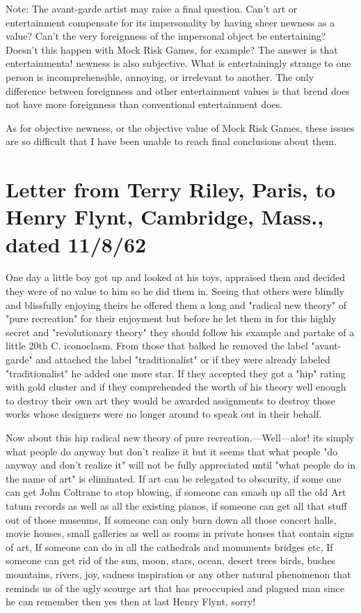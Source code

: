 \documentclass[10pt,twoside,draft]{memoir}
\begin{document}
{Note: The avant-garde artist may raise a final question. Can't art or 
entertainment compensate for its impersonality by having sheer newness as a 
value? Can't the very foreignness of the impersonal object be entertaining? 
Doesn't this happen with Mock Risk Games, for example? The answer is 
that entertainmenta! newness is also subjective. What is entertainingly 
strange to one person is incomprehensible, annoying, or irrelevant to 
another. The only difference between foreignness and other entertainment 
values is that brend does not have more foreignness than conventional 
entertainment does. 

As for objective newness, or the objective value of Mock Risk Games, these 
issues are so difficult that I have been unable to reach final conclusions 
about them. 

\clearpage

\section{Letter from Terry Riley, Paris, to Henry Flynt, Cambridge, 
Mass., dated 11/8/62}

One day a little boy got up and looked at his toys, appraised them and 
decided they were of no value to him so he did them in. Seeing that others 
were blindly and blissfully enjoying theirs he offered them a long and 
"radical new theory" of "pure recreation" for their enjoyment but before he 
let them in for this highly secret and "revolutionary theory" they should 
follow his example and partake of a little 20th C. iconoclasm. From those 
that balked he removed the label "avant-garde" and attached the label 
"traditionalist" or if they were already labeled "traditionalist" he added one 
more star. If they accepted they got a "hip" rating with gold cluster and if 
they comprehended the worth of his theory well enough to destroy their 
own art they would be awarded assignments to destroy those works whose 
designers were no longer around to speak out in their behalf. 

Now about this hip radical new theory of pure recreation.---Well---alor! its 
simply what people do anyway but don't realize it but it seems that what 
people "do anyway and don't realize it" will not be fully appreciated until 
"what people do in the name of art" is eliminated. If art can be relegated to 
obscurity, if some one can get John Coltrane to stop blowing, if someone 
can smash up all the old Art tatum records as well as all the existing pianos, 
if someone can get all that stuff out of those museums, If someone can only 
burn down all those concert halls, movie houses, small galleries as well as 
rooms in private houses that contain signs of art, If someone can do in all the 
cathedrals and monuments bridges etc, If someone can get rid of the sun, 
moon, stars, ocean, desert trees birds, bushes mountains, rivers, joy, sadness 
inspiration or any other natural phenomenon that reminds us of the ugly 
scourge art that has preoccupied and plagued man since he can remember 
then yes then at last Henry Flynt, sorry! 

}
\end{document}

